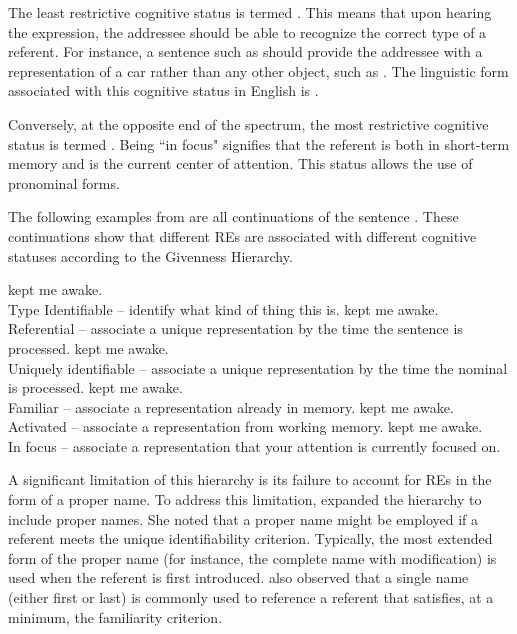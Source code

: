 The least restrictive cognitive status is termed . This means that upon hearing the expression, the addressee should be able to recognize the correct type of a referent. For instance, a sentence such as  should provide the addressee with a representation of a car rather than any other object, such as . The linguistic form associated with this cognitive status in English is \val{ + }.

Conversely, at the opposite end of the spectrum, the most restrictive cognitive status is termed . Being ``in focus" signifies that the referent is both in short-term memory and is the current center of attention. This status allows the use of pronominal forms. 

The following examples from \citet[129]{gundel2003} are all continuations of the sentence . These continuations show that different REs are associated with different cognitive statuses according to the Givenness Hierarchy.

\begin{exe}
	\ex
	\begin{xlist}
		\ex {} kept me awake. \\
		Type Identifiable -- identify what kind of thing this is.
		\ex {} kept me awake.\\
		Referential -- associate a unique representation by the time the sentence is processed.
		\ex {} kept me awake.\\
		Uniquely identifiable -- associate a unique representation by the time the nominal is processed.
		\ex {} kept me awake.\\
		Familiar -- associate a representation already in memory.
		\ex {} kept me awake.\\
		Activated -- associate a representation from working memory.
		\ex {} kept me awake.\\
		In focus -- associate a representation that your attention is currently focused on.
	\end{xlist}
\end{exe}

A significant limitation of this hierarchy is its failure to account for REs in the form of a proper name. To address this limitation, \citet{Mulkern1996} expanded the hierarchy to include proper names. She noted that a proper name might be employed if a referent meets the unique identifiability criterion. Typically, the most extended form of the proper name (for instance, the complete name with modification) is used when the referent is first introduced. \citeauthor{Mulkern1996} also observed that a single name (either first or last) is commonly used to reference a referent that satisfies, at a minimum, the familiarity criterion.

